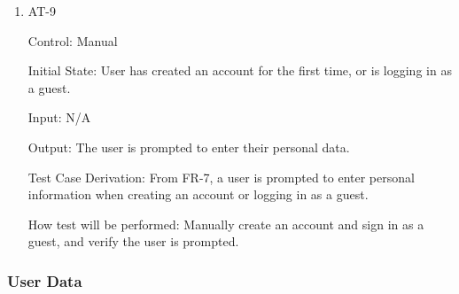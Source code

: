 \documentclass[12pt, titlepage]{article}
\begin{document}
\begin{enumerate}
\item{AT-9\\}

Control: Manual
					
Initial State: User has created an account for the first time, or is logging in as a guest.
					
Input: N/A
					
Output: The user is prompted to enter their personal data.

Test Case Derivation: From FR-7, a user is prompted to enter personal information when creating an account or logging in as a guest.

How test will be performed: Manually create an account and sign in as a guest, and verify the user is prompted.

\end{enumerate}

\subsubsection{User Data}
\end{document}
